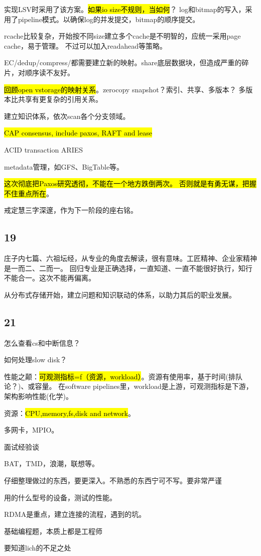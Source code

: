 实现LSV时采用了该方案。\hl{如果io size不规则，当如何}？
log和bitmap的写入，采用了pipeline模式。以确保log的并发提交，bitmap的顺序提交。

rcache比较复杂，开始按不同size建立多个cache是不明智的，应统一采用page cache，易于管理。
不过可以加入readahead等策略。

EC/dedup/compress/都需要建立新的映射。share底层数据块，但造成严重的碎片，对顺序读不友好。

\hl{回顾open vstorage的映射关系}。zerocopy snapshot？索引、共享、多版本？
多版本比共享有更复杂的引用关系。

\hrulefill

建立知识体系，依次scan各个分支领域。
\begin{enumbox}
\item \hl{CAP consensus, include paxos, RAFT and lease}
\item ACID transaction ARIES
\item metadata管理，如GFS、BigTable等。
\end{enumbox}

\hl{这次彻底把Paxos研究透彻，不能在一个地方跌倒两次。
否则就是有勇无谋，把握不住重点所在}。

戒定慧三字深邃，作为下一阶段的座右铭。

\subsection{19}

庄子内七篇、六祖坛经，从专业的角度去解读，很有意味。工匠精神、企业家精神是一而二、二而一。
回归专业是正确选择，一直知道、一直不能很好执行，知行不能合一。这次不能再偏离。

从分布式存储开始，建立问题和知识联动的体系，以助力其后的职业发展。

\subsection{21}

怎么查看cs和中断信息？

如何处理slow disk？

性能之颠：\hl{可观测指标=f（资源，workload）}。资源有使用率，基于时间(排队论？)、或容量。
在software pipelines里，workload是上游，可观测指标是下游，架构影响性能(化学)。

资源：\hl{CPU,memory,fs,disk and network}。

多网卡，MPIO。

面试经验谈
\begin{enumbox}
\item BAT，TMD，浪潮，联想等。
\item 仔细整理做过的东西，要更深入。不熟悉的东西宁可不写。要非常严谨
\item 用的什么型号的设备，测试的性能。
\item RDMA是重点，建立连接的流程，遇到的坑。
\item 基础编程题，本质上都是工程师
\item 要知道lich的不足之处
\end{enumbox}
